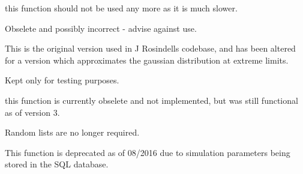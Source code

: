 
\begin{DoxyRefList}
\item[\label{deprecated__deprecated000004}%
\hypertarget{deprecated__deprecated000004}{}%
Member \hyperlink{class_matrix_ace5dbaac7d1be865b2f366bfe8896a41}{Matrix$<$ T $>$\+:\+:import\+Csv} (string filename)]this function should not be used any more as it is much slower.  
\item[\label{deprecated__deprecated000003}%
\hypertarget{deprecated__deprecated000003}{}%
Member \hyperlink{class_n_rrand_aef021289f62893215204589af450bf65}{N\+Rrand\+:\+:direction} ()]Obselete and possibly incorrect -\/ advise against use.  
\item[\label{deprecated__deprecated000001}%
\hypertarget{deprecated__deprecated000001}{}%
Member \hyperlink{class_n_rrand_a464101f3def678477f9156d0bd1aab54}{N\+Rrand\+:\+:fattail} (double z)]This is the original version used in J Rosindell\textquotesingle{}s codebase, and has been altered for a version which approximates the gaussian distribution at extreme limits.  
\item[\label{deprecated__deprecated000002}%
\hypertarget{deprecated__deprecated000002}{}%
Member \hyperlink{class_n_rrand_aab0ec97e2c0f74cf38cc7047356cae5c}{N\+Rrand\+:\+:fattail\+\_\+old} ()]Kept only for testing purposes.  
\item[\label{deprecated__deprecated000006}%
\hypertarget{deprecated__deprecated000006}{}%
Member \hyperlink{class_tree_a8f4c4cbc5ad516f0fde489c9a826e676}{CoalescenceTree\+:\+:est\+Specnum} ()]this function is currently obselete and not implemented, but was still functional as of version 3.
\item[\label{deprecated__deprecated000005}%
\hypertarget{deprecated__deprecated000005}{}%
Member \hyperlink{class_tree_a27bd274fe727892c84d153d9bd5ddbf0}{CoalescenceTree\+:\+:random\+List} (long maxnum, long numnum)]Random lists are no longer required.
\item[\label{deprecated__deprecated000007}%
\hypertarget{deprecated__deprecated000007}{}%
Member \hyperlink{class_treelist_acaa619f2d186f60c9c9fa5d90db0da68}{Treelist\+:\+:detect\+Dimensions} (string db)]This function is deprecated as of 08/2016 due to simulation parameters being stored in the S\+QL database. 
\end{DoxyRefList}